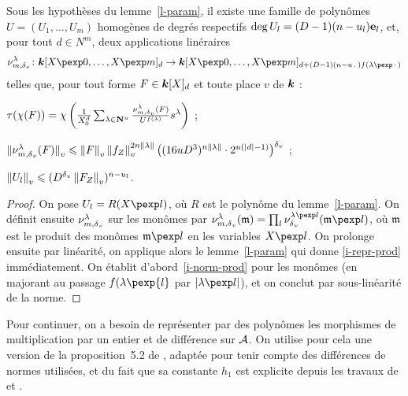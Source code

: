 \documentclass{mpg-preth}
\begin{document}
\begin{lem} \label{l-par-prod}
  Sous les hypothèses du lemme~\ref{l-param}, il existe une famille de polynômes
  $U = (U_1, \ldots, U_m)$ homogènes de degrés respectifs $\deg U_l =
  (D-1)(n-u_l){\mathbf e}_l$, et, pour tout $d \in N^m$, deux applications linéraires
  \[
    \nu_{m, \dv}^\lambda \colon \cdn[X\pexp 0, \ldots, X\pexp m]_d \to
    \cdn[X\pexp 0, \ldots, X\pexp m]_{d + (D-1)(n-u_\truc)f(\lambda\pexp\truc)}
  \]
  telles que, pour tout forme $F\in \boldsymbol{k}[X]_d$ et toute place $v$ de $\boldsymbol{k}$ :
  \begin{enumthm}
    \item \label{i-repr-prod} $\tau(\chi(F)) =
      \chi\left( \frac1{X_0^d} \sum_{\lambda \in \cramped{\N^u}}
      \frac {\nu_{m, \dv}^\lambda(F)} {U^{f(\lambda)}} s^\lambda \right)$ ;
    \item \label{i-norm-prod} $\left\lVert\smash{\nu_{m, {\delta\smash{_v}}}^\lambda(F)}\right\rVert_{v} \leqslant \left\lVert F\right\rVert_{v}
      \left\lVert f_Z\right\rVert_{v}^{2n\lVert\lambda\rVert} \bigl(
      (16uD^3)^{n\lVert\lambda\rVert} \cdot 2^{u(\left\lvert d\right\rvert -1)} \bigr)^{\delta\smash{_v}}$ ;
    \item $\left\lVert U_l\right\rVert_{v} \leqslant (D^{\delta\smash{_v}} \left\lVert F_Z\right\rVert_{v})^{n-u_l}$.
  \end{enumthm}
\end{lem}

\begin{proof}
  On pose $U_l = R(X\pexp l)$, où $R$ est le polynôme du lemme~\ref{l-param}.
  On définit ensuite $\nu_{m, {\delta\smash{_v}}}^\lambda$ sur les monômes par $\nu_{m,
  \dv}^\lambda(\mathfrak m) = \prod_l \nu_\dv^{\lambda\pexp l}(\mathfrak m\pexp
  l)$, où $\mathfrak m$ est le produit des monômes $\mathfrak m\pexp l$ en les
  variables $X\pexp l$. On prolonge ensuite par linéarité, on applique alors le
  lemme~\ref{l-param} qui donne \ref{i-repr-prod} immédiatement. On établit
  d'abord~\ref{i-norm-prod} pour les monômes (en majorant au passage
  $f(\lambda\pexp{l}$ par $\lgr{\lambda\pexp l}$), et on conclut par
  sous-linéarité de la norme.
\end{proof}

Pour continuer, on a besoin de représenter par des polynômes les morphismes de
multiplication par un entier et de différence sur $\mathcal{A}$. On utilise pour cela une
version de la proposition~5.2 de , adaptée pour tenir compte des
différences de normes utilisées, et du fait que sa constante $h_1$ est explicite
depuis les travaux de  et .
\end{document}
